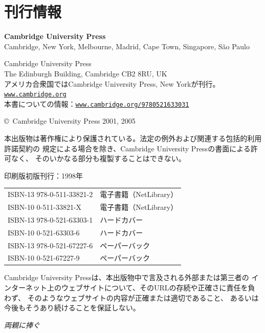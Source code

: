 \clearpage
\section*{刊行情報}
\begingroup
\small
\noindent\textbf{Cambridge University Press}\\
Cambridge, New York, Melbourne, Madrid, Cape Town, Singapore, São Paulo

\noindent Cambridge University Press\\
The Edinburgh Building, Cambridge CB2 8RU, UK\\
アメリカ合衆国ではCambridge University Press, New Yorkが刊行。\\
\href{https://www.cambridge.org}{\nolinkurl{www.cambridge.org}}\\
本書についての情報：\href{https://www.cambridge.org/9780521633031}{\nolinkurl{www.cambridge.org/9780521633031}}

\noindent\copyright\ Cambridge University Press 2001, 2005

本出版物は著作権により保護されている。法定の例外および関連する包括的利用許諾契約の
規定による場合を除き、Cambridge University Pressの書面による許可なく、
そのいかなる部分も複製することはできない。

\noindent 印刷版初版刊行：1998年

\begin{tabular}{@{}ll@{}}
ISBN-13 978-0-511-33821-2 & 電子書籍（NetLibrary）\\
ISBN-10 0-511-33821-X & 電子書籍（NetLibrary）\\[1ex]
ISBN-13 978-0-521-63303-1 & ハードカバー\\
ISBN-10 0-521-63303-6 & ハードカバー\\[1ex]
ISBN-13 978-0-521-67227-6 & ペーパーバック\\
ISBN-10 0-521-67227-9 & ペーパーバック
\end{tabular}

Cambridge University Pressは、本出版物中で言及される外部または第三者の
インターネット上のウェブサイトについて、そのURLの存続や正確さに責任を負わず、
そのようなウェブサイトの内容が正確または適切であること、
あるいは今後もそうあり続けることを保証しない。
\endgroup

\bigskip
\begin{center}
\itshape 両親に捧ぐ
\end{center}

\clearpage
